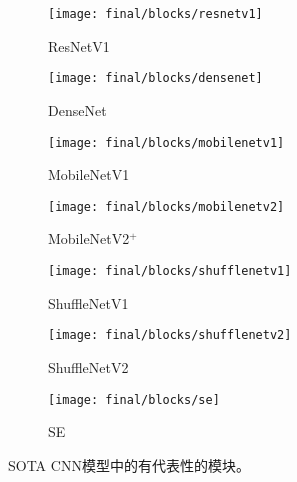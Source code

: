 \begin{figure}[htbp]
    \centering
    \begin{subfigure}[b]{0.1696\linewidth}
    	\centering\texttt{[image: final/blocks/resnetv1]}
    	\caption{\label{fig:blocks:resnet}ResNetV1}
	\end{subfigure}
	\hspace{2.7em}
    \begin{subfigure}[b]{0.1696\linewidth}
    	\centering\texttt{[image: final/blocks/densenet]}
    	\caption{\label{fig:blocks:densenet}DenseNet}
	\end{subfigure}
	\hspace{2.7em}
	\begin{subfigure}[b]{0.1808\linewidth}
		\centering\texttt{[image: final/blocks/mobilenetv1]}
		\caption{\label{fig:blocks:mobilenetv1}MobileNetV1}
	\end{subfigure}
	\hspace{2.7em}
	\begin{subfigure}[b]{0.2\linewidth}
		\centering\texttt{[image: final/blocks/mobilenetv2]}
		\caption{\label{fig:blocks:mobilenetv2}\small{MobileNetV2$^+$}}
	\end{subfigure}
	\hspace{2.7em}
	\begin{subfigure}[b]{0.184\linewidth}
		\centering\texttt{[image: final/blocks/shufflenetv1]}
		\caption{\label{fig:blocks:shufflenetv1}ShuffleNetV1}
	\end{subfigure}
	\hspace{2.7em}
	\begin{subfigure}[b]{0.1872\linewidth}
		\centering\texttt{[image: final/blocks/shufflenetv2]}
		\caption{\label{fig:blocks:shufflenetv2}ShuffleNetV2}
	\end{subfigure}
	\hspace{2.7em}
	\begin{subfigure}[b]{0.1808\linewidth}
		\centering\texttt{[image: final/blocks/se]}
		\caption{\label{fig:blocks:se}SE}
	\end{subfigure}
    \caption{
        SOTA CNN模型中的有代表性的模块。
        \footnotesize{}
	}
	\label{fig:blocks}
\end{figure}
